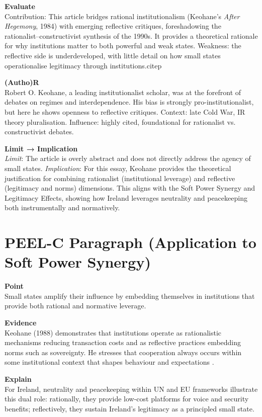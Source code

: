 \textbf{Evaluate} \\
Contribution: This article bridges rational institutionalism (Keohane’s \textit{After Hegemony}, 1984) with emerging reflective critiques, foreshadowing the rationalist–constructivist synthesis of the 1990s. It provides a theoretical rationale for why institutions matter to both powerful and weak states. Weakness: the reflective side is underdeveloped, with little detail on how small states operationalise legitimacy through institutions.citep

\textbf{(Autho)R} \\
Robert O. Keohane, a leading institutionalist scholar, was at the forefront of debates on regimes and interdependence. His bias is strongly pro-institutionalist, but here he shows openness to reflective critiques. Context: late Cold War, IR theory pluralisation. Influence: highly cited, foundational for rationalist vs. constructivist debates.

\textbf{Limit → Implication} \\
\textit{Limit}: The article is overly abstract and does not directly address the agency of small states.  
\textit{Implication}: For this essay, Keohane provides the theoretical justification for combining rationalist (institutional leverage) and reflective (legitimacy and norms) dimensions. This aligns with the Soft Power Synergy and Legitimacy Effects, showing how Ireland leverages neutrality and peacekeeping both instrumentally and normatively.

\section*{PEEL-C Paragraph (Application to Soft Power Synergy)}

\textbf{Point} \\
Small states amplify their influence by embedding themselves in institutions that provide both rational and normative leverage.  

\textbf{Evidence} \\
Keohane (1988) demonstrates that institutions operate as rationalistic mechanisms reducing transaction costs and as reflective practices embedding norms such as sovereignty. He stresses that cooperation always occurs within some institutional context that shapes behaviour and expectations \parencite{KEOHANE_1988}.  

\textbf{Explain} \\
For Ireland, neutrality and peacekeeping within UN and EU frameworks illustrate this dual role: rationally, they provide low-cost platforms for voice and security benefits; reflectively, they sustain Ireland’s legitimacy as a principled small state.  

